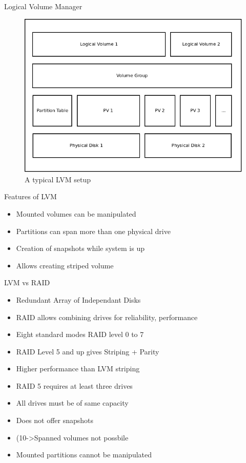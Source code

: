 \documentclass{beamer}
\begin{document}
\begin{frame}{Logical Volume Manager}
    \begin{figure}
        \includegraphics[scale=0.4]{lvm.png}
        \caption{A typical LVM setup}
    \end{figure}
\end{frame}

\begin{frame}{Features of LVM}
    \begin{itemize}
        \item<2-> Mounted volumes can be manipulated
        \item<3-> Partitions can span more than one physical drive
        \item<4-> Creation of snapshots while system is up
        \item<5-> Allows creating striped volume
    \end{itemize}
\end{frame}

\begin{frame}{LVM vs RAID}
    \begin{itemize}
        \item<2-> Redundant Array of Independant Disks 
        \item<3-> RAID allows combining drives for reliability, performance
        \item<4-> Eight standard modes RAID level 0 to 7
        \item<5-> RAID Level 5 and up gives Striping + Parity
        \item<6-> Higher performance than LVM striping
        \item<7-> RAID 5 requires at least three drives
        \item<8-> All drives must be of same capacity
        \item<9-> Does not offer snapshots
        \item(10->Spanned volumes not possbile
        \item<11->Mounted partitions cannot be manipulated
    \end{itemize}
\end{frame}
\end{document}
